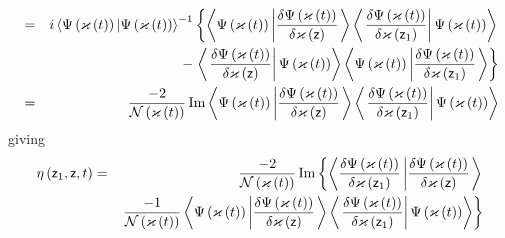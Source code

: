 \begin{eqnarray}
&=&i\left\langle \Psi \left( {\cal \varkappa }\left( t\right) \right) |\Psi
\left( {\cal \varkappa }\left( t\right) \right) \right\rangle ^{-1}\left\{
\left\langle \Psi \left( {\cal \varkappa }\left( t\right) \right) \left| 
\frac{\delta \Psi \left( {\cal \varkappa }\left( t\right) \right) }{\delta 
{\cal \varkappa }\left( {\sf z}\right) }\right. \right\rangle \left\langle
\left. \frac{\delta \Psi \left( {\cal \varkappa }\left( t\right) \right) }{%
\delta {\cal \varkappa }\left( {\sf z}_{1}\right) }\right| \Psi \left( {\cal %
\varkappa }\left( t\right) \right) \right\rangle \right.   \nonumber \\
&&-\left. \left\langle \left. \frac{\delta \Psi \left( {\cal \varkappa }%
\left( t\right) \right) }{\delta {\cal \varkappa }\left( {\sf z}\right) }%
\right| \Psi \left( {\cal \varkappa }\left( t\right) \right) \right\rangle
\left\langle \Psi \left( {\cal \varkappa }\left( t\right) \right) \left| 
\frac{\delta \Psi \left( {\cal \varkappa }\left( t\right) \right) }{\delta 
{\cal \varkappa }\left( {\sf z}_{1}\right) }\right. \right\rangle \right\}  
\nonumber \\
&=&\frac{-2}{{\cal N}\left( {\cal \varkappa }\left( t\right) \right) }%
\mathop{\rm Im}%
\left\langle \Psi \left( {\cal \varkappa }\left( t\right) \right) \left| 
\frac{\delta \Psi \left( {\cal \varkappa }\left( t\right) \right) }{\delta 
{\cal \varkappa }\left( {\sf z}\right) }\right. \right\rangle \left\langle
\left. \frac{\delta \Psi \left( {\cal \varkappa }\left( t\right) \right) }{%
\delta {\cal \varkappa }\left( {\sf z}_{1}\right) }\right| \Psi \left( {\cal %
\varkappa }\left( t\right) \right) \right\rangle 
\end{eqnarray}%
giving 
\begin{eqnarray}
\eta \left( {\sf z}_{1},{\sf z},t\right)  &=&\frac{-2}{{\cal N}\left( {\cal %
\varkappa }\left( t\right) \right) }%
\mathop{\rm Im}%
\left\{ \left\langle \frac{\delta \Psi \left( {\cal \varkappa }\left(
t\right) \right) }{\delta {\cal \varkappa }\left( {\sf z}_{1}\right) }\left| 
\frac{\delta \Psi \left( {\cal \varkappa }\left( t\right) \right) }{\delta 
{\cal \varkappa }\left( {\sf z}\right) }\right. \right\rangle \right.  
\nonumber \\
&&\left. \frac{-1}{{\cal N}\left( {\cal \varkappa }\left( t\right) \right) }%
\left\langle \Psi \left( {\cal \varkappa }\left( t\right) \right) \left| 
\frac{\delta \Psi \left( {\cal \varkappa }\left( t\right) \right) }{\delta 
{\cal \varkappa }\left( {\sf z}\right) }\right. \right\rangle \left\langle
\left. \frac{\delta \Psi \left( {\cal \varkappa }\left( t\right) \right) }{%
\delta {\cal \varkappa }\left( {\sf z}_{1}\right) }\right| \Psi \left( {\cal %
\varkappa }\left( t\right) \right) \right\rangle \right\} 
\end{eqnarray}%
